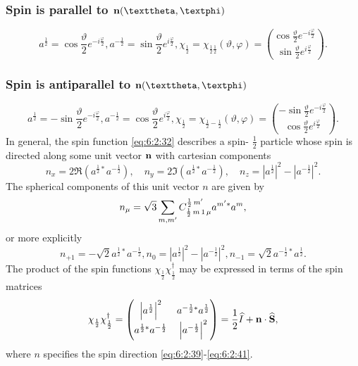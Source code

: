 \subsubsection{Spin is parallel to $\vect{n}(\vartheta, \varphi)$}
\begin{equation}
a^{\frac{1}{2}}=\cos \frac{\vartheta}{2} e^{-i \frac{\varphi}{2}}, a^{-\frac{1}{2}}=\sin \frac{\vartheta}{2} e^{i \frac{\varphi}{2}}, \chi_{\frac{1}{2}}=\chi_{\frac{1}{2} \frac{1}{2}}(\vartheta, \varphi)=\binom{\cos \frac{\vartheta}{2} e^{-i \frac{\varphi}{2}}}{\sin \frac{\vartheta}{2} e^{i \frac{\varphi}{2}}} . \label{eq:6:2:37}
\end{equation}
\subsubsection{Spin is antiparallel to $\vect{n}(\vartheta, \varphi)$}
\begin{equation}
a^{\frac{1}{2}}=-\sin \frac{\vartheta}{2} e^{-i \frac{\varphi}{2}}, a^{-\frac{1}{2}}=\cos \frac{\vartheta}{2} e^{i \frac{\varphi}{2}}, \chi_{\frac{1}{2}}=\chi_{\frac{1}{2}-\frac{1}{2}}(\vartheta, \varphi)=\binom{-\sin \frac{\vartheta}{2} e^{-i \frac{\varphi}{2}}}{\cos \frac{\vartheta}{2} e^{i \frac{\varphi}{2}}} . \label{eq:6:2:38}
\end{equation}
In general, the spin function \eqref{eq:6:2:32} describes a spin- $\frac{1}{2}$ particle whose spin is directed along some unit vector $\mathbf{n}$ with cartesian components
\begin{equation}
n_{x}=2 \Re  \left(a^{\frac{1}{2} *} a^{-\frac{1}{2}}\right),\quad n_{y}=2 \Im  \left(a^{\frac{1}{2} *} a^{-\frac{1}{2}}\right),\quad n_{z}=\left|a^{\frac{1}{2}}\right|^{2}-\left|a^{-\frac{1}{2}}\right|^{2} . \label{eq:6:2:39}
\end{equation}
The spherical components of this unit vector $n$ are given by
\begin{equation}
n_{\mu}=\sqrt{3} \sum_{m, m^{\prime}} C_{\frac{1}{2}\,m\,1\,\mu}^{\frac{1}{2}\,m^{\prime}} a^{m^{\prime} *} a^{m}, \label{eq:6:2:40}
\end{equation}
or more explicitly
\begin{equation}
n_{+1}=-\sqrt{2} a^{\frac{1}{2} *} a^{-\frac{1}{2}}, n_{0}=\left|a^{\frac{1}{2}}\right|^{2}-\left|a^{-\frac{1}{2}}\right|^{2}, n_{-1}=\sqrt{2} a^{-\frac{1}{2} *} a^{\frac{1}{2}} . \label{eq:6:2:41}
\end{equation}
The product of the spin functions $\chi_{\frac{1}{2}} \chi_{\frac{1}{2}}^{\dagger}$ may be expressed in terms of the spin matrices
\begin{equation}
\chi_{\frac{1}{2}} \chi_{\frac{1}{2}}^{\dagger}=\begin{pmatrix}
\left|a^{\frac{1}{2}}\right|^{2} & a^{-\frac{1}{2} *} a^{\frac{1}{2}} \label{eq:6:2:42}\\
a^{\frac{1}{2} *} a^{-\frac{1}{2}} & \left|a^{-\frac{1}{2}}\right|^{2}
\end{pmatrix}=\frac{1}{2} \widehat{I}+\mathbf{n} \cdot \widehat{\mathbf{S}},
\end{equation}
where $n$ specifies the spin direction \eqref{eq:6:2:39}-\eqref{eq:6:2:41}.

